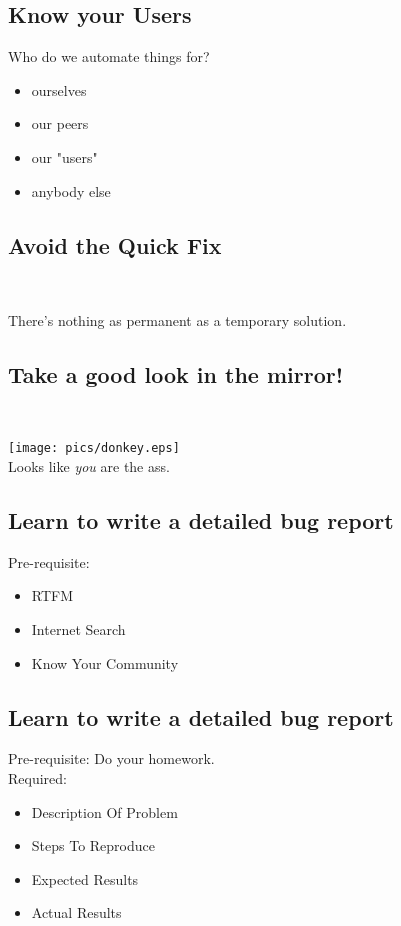 \documentclass[xga]{xdvislides}
\begin{document}
\subsection{Know your Users}
Who do we automate things for?
\begin{itemize}
	\item ourselves
	\item our peers
	\item our "users"
	\item anybody else
\end{itemize}

\subsection{Avoid the Quick Fix}
\\
\Huge
\begin{center}
	There's nothing as permanent as a temporary solution.
\end{center}
\Normalsize

\subsection{Take a good look in the mirror!}
\\
\vspace*{\fill}
\begin{center}
	\texttt{[image: pics/donkey.eps]} \\
	\small
	Looks like {\em you} are the ass.
\end{center}
\vspace*{\fill}

\subsection{Learn to write a detailed bug report}
Pre-requisite:
\begin{itemize}
	\item RTFM
	\item Internet Search
	\item Know Your Community
\end{itemize}

\subsection{Learn to write a detailed bug report}
Pre-requisite: Do your homework. \\

Required:
\begin{itemize}
	\item Description Of Problem
	\item Steps To Reproduce
	\item Expected Results
	\item Actual Results
\end{itemize}
\end{document}
